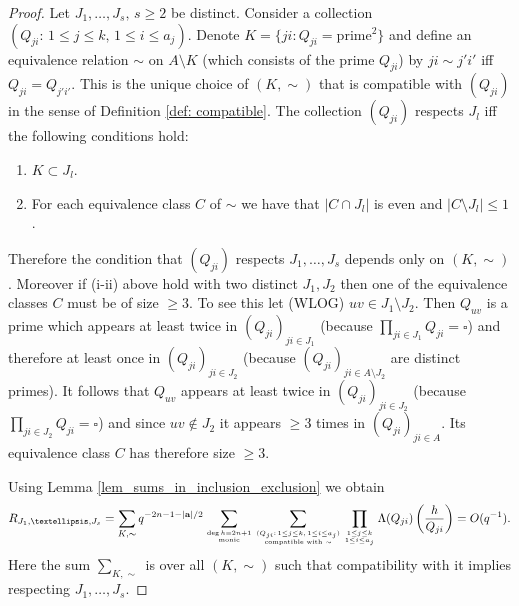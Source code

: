 \documentclass[10pt,a4paper]{amsart}
\begin{document}
\begin{proof}
Let $J_1,\ldots,J_s,\,s\ge 2$ be distinct. Consider a collection $(Q_{ji}:\,1\le j\le k,\,1\le i\le a_j)$. Denote $K=\{ji: Q_{ji}=\text{prime}^2\}$ and define an equivalence relation $\sim$ on $A\setminus K$ (which consists of the prime $Q_{ji}$) by $ji\sim j'i'$ iff $Q_{ji}=Q_{j'i'}$. This is the unique choice of $(K,\sim)$ that is compatible with $(Q_{ji})$ in the sense of Definition \ref{def: compatible}. The collection $(Q_{ji})$ respects $J_l$ iff the following conditions hold:
\begin{enumerate}
\item[(i)] $K\subset J_l$.
\item[(ii)] For each equivalence class $C$ of $\sim$ we have that $|C\cap J_l|$ is even and $|C\setminus J_l|\le 1$.
\end{enumerate}
Therefore the condition that $(Q_{ji})$ respects $J_1,\ldots,J_s$ depends only on $(K,\sim)$. Moreover if (i-ii) above hold with two distinct $J_1,J_2$ then one of the equivalence classes $C$ must be of size $\ge 3$. To see this let (WLOG) $uv\in J_1\setminus J_2$. Then $Q_{uv}$ is a prime which appears at least twice in $(Q_{ji})_{ji\in J_1}$ (because $\prod_{ji\in J_1}Q_{ji}=\square$) and therefore at least once in $(Q_{ji})_{ji\in J_2}$ (because $(Q_{ji})_{ji\in A\setminus J_2}$ are distinct primes). It follows that $Q_{uv}$ appears at least twice in $(Q_{ji})_{ji\in J_2}$ (because $\prod_{ji\in J_2}Q_{ji}=\square$) and since $uv\not\in J_2$ it appears $\ge 3$ times in $(Q_{ji})_{ji\in A}$. Its equivalence class $C$ has therefore size $\ge 3$. 

Using Lemma \ref{lem_sums_in_inclusion_exclusion} we obtain
$$R_{J_1,\ldots,J_s}=\sum_{K,\sim}q^{-2n-1-|\mathbf a|/2}\sum_{\deg h=2n+1\atop{\text{monic}}}\sum_{(Q_{ji}:\,1\le j\le k,\,1\le i\le a_j)\atop{\text{compatible with $\sim$}}}\prod_{1\le j\le k\atop{1\le i\le a_j}}\Lambda(Q_{ji})\left(\frac h{Q_{ji}}\right)=O(q^{-1}).$$
Here the sum $\sum_{K,\sim}$ is over all $(K,\sim)$ such that compatibility with it implies respecting $J_1,\ldots,J_s$.





\end{proof}
\end{document}
